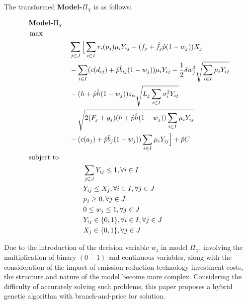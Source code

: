 \documentclass[]{article}
\theoremstyle{plain}%
\theoremstyle{definition}
\theoremstyle{remark}
\theoremstyle{plain}%
\begin{document}
    The transformed \textbf{Model-}$\Pi_\chi$ is as follows:
    
    \begin{align}
    \label{model2}
    & \textbf{Model-} \Pi_\chi & & \notag\\
    & \max        & & \notag\\
    & & &\sum_{j\in J} \Big[ \sum_{i\in I}r_i(p_j)\mu_iY_{ij}-(f_j+\hat{f}_j\hat{p}(1-w_j))X_j \notag  \\
    & & &-\sum_{i\in I}(c(d_{ij})+\hat{p}\hat{b}_{ij}(1-w_j))\mu_iY_{ij} 
    -\frac{1}{2}\delta w^2_j \sqrt{\sum_{i\in I}\mu_iY_{ij}}\notag  \\
    & & &-(h+\hat{p}\hat{h}(1-w_j))z_{\alpha} \sqrt{L_j\sum_{i\in I}\sigma^2_iY_{ij}}
    \notag  \\
    & & &-\sqrt{2({F_j+g_j})(h+\hat{p}\hat{h}(1-w_j))\sum_{i\in I}\mu_iY_{ij}} \notag  \\
    & & &-(c(a_{j})+\hat{p}\hat{b}_j(1-w_j))\sum_{i\in I}\mu_iY_{ij}  \Big]+\hat{p}C \\
    & \mbox{subject to} && \notag  \\
    & & &\quad\quad \sum_{j\in J}Y_{ij} \leq 1, \forall{i\in I} \\
    & & &\quad\quad Y_{ij} \leq X_j ,  \forall{i\in I}, \forall{j\in J} \\
    & & &\quad\quad p_j \geq 0, \forall{j\in J} \\
    & & &\quad\quad 0 \leq w_j \leq 1, \forall{j\in J} \\
    & & &\quad\quad Y_{ij} \in \{0,1\},  \forall{i\in I}, \forall{j\in J} \\
    & & &\quad\quad X_{j} \in \{0,1\} ,  \forall{j\in J} 
    \end{align}
    
    Due to the introduction of the decision variable $w_j$ in model $\Pi_\chi$, involving the multiplication of binary $(0-1)$ and continuous variables, along with the consideration of the impact of emission reduction technology investment costs, the structure and nature of the model become more complex. Considering the difficulty of accurately solving such problems, this paper proposes a hybrid genetic algorithm with branch-and-price for solution.
    
    
\end{document}
